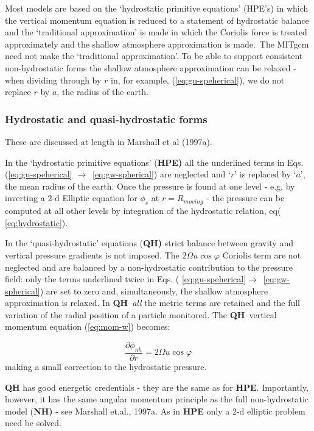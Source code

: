 Most models are based on the `hydrostatic primitive equations' (HPE's) in
which the vertical momentum equation is reduced to a statement of
hydrostatic balance and the `traditional approximation' is made in which the
Coriolis force is treated approximately and the shallow atmosphere
approximation is made.\ The MITgcm need not make the `traditional
approximation'. To be able to support consistent non-hydrostatic forms the
shallow atmosphere approximation can be relaxed - when dividing through by $
r $ in, for example, (\ref{eq:gu-speherical}), we do not replace $r$ by $a$,
the radius of the earth.

\subsubsection{Hydrostatic and quasi-hydrostatic forms}
\label{sec:hydrostatic_and_quasi-hydrostatic_forms}

These are discussed at length in Marshall et al (1997a).

In the `hydrostatic primitive equations' (\textbf{HPE)} all the underlined
terms in Eqs. (\ref{eq:gu-speherical} $\rightarrow $\ \ref{eq:gw-spherical})
are neglected and `${r}$' is replaced by `$a$', the mean radius of the
earth. Once the pressure is found at one level - e.g. by inverting a 2-d
Elliptic equation for $\phi _{s}$ at $r=R_{moving}$ - the pressure can be
computed at all other levels by integration of the hydrostatic relation, eq(
\ref{eq:hydrostatic}).

In the `quasi-hydrostatic' equations (\textbf{QH)} strict balance between
gravity and vertical pressure gradients is not imposed. The $2\Omega u\cos
\varphi $ Coriolis term are not neglected and are balanced by a non-hydrostatic
contribution to the pressure field: only the terms underlined twice in Eqs. (
\ref{eq:gu-speherical}$\rightarrow $\ \ref{eq:gw-spherical}) are set to zero
and, simultaneously, the shallow atmosphere approximation is relaxed. In 
\textbf{QH}\ \textit{all} the metric terms are retained and the full
variation of the radial position of a particle monitored. The \textbf{QH}\
vertical momentum equation (\ref{eq:mom-w}) becomes:

\begin{equation*}
\frac{\partial \phi _{nh}}{\partial r}=2\Omega u\cos \varphi
\end{equation*}
making a small correction to the hydrostatic pressure.

\textbf{QH} has good energetic credentials - they are the same as for 
\textbf{HPE}. Importantly, however, it has the same angular momentum
principle as the full non-hydrostatic model (\textbf{NH)} - see Marshall
et.al., 1997a. As in \textbf{HPE }only a 2-d elliptic problem need be solved.

